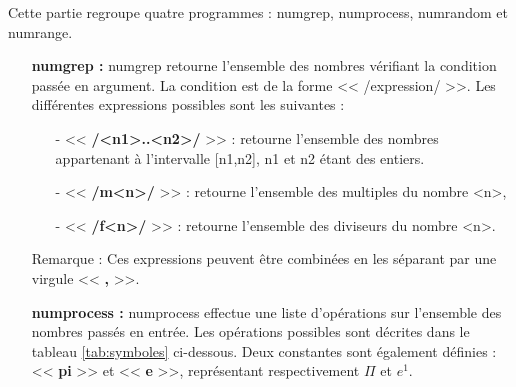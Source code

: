 Cette partie regroupe quatre programmes : numgrep, numprocess, numrandom et numrange.
\newline
\begin{itemize}
 \item[\textbullet] \textbf{numgrep :} numgrep retourne l'ensemble des nombres v\'erifiant la condition pass\'ee en argument. La condition est de la
forme << /expression/ >>. Les diff\'erentes expressions possibles sont les suivantes :
  \begin{itemize}
  \item[-] << \textbf{/<n1>..<n2>/} >> : retourne l'ensemble des nombres appartenant \`a l'intervalle [n1,n2], n1 et n2 \'etant des entiers.
  \item[-] << \textbf{/m<n>/} >> : retourne l'ensemble des multiples du nombre <n>,
  \item[-] << \textbf{/f<n>/} >> : retourne l'ensemble des diviseurs du nombre <n>.
  \end{itemize}
Remarque : Ces expressions peuvent \^etre combin\'ees en les s\'eparant par une virgule << \textbf{,} >>.
\newline{}
 \item[\textbullet] \textbf{numprocess :} numprocess effectue une liste d'op\'erations sur l'ensemble des nombres pass\'es en entr\'ee.
Les op\'erations possibles sont d\'ecrites dans le tableau \ref{tab:symboles} ci-dessous. Deux constantes sont \'egalement d\'efinies : << \textbf{pi} >> 
et << \textbf{e} >>, repr\'esentant respectivement $\Pi$ et $e^1$.
\begin{table}[h]
\begin{center}


\end{center}
\end{table}
\end{itemize}
